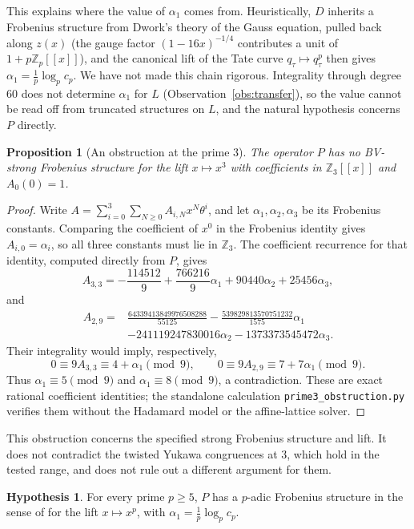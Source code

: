 \documentclass[11pt]{amsart}
\newtheorem{proposition}[theorem]{Proposition}
\theoremstyle{definition}
\newtheorem{hypothesis}[theorem]{Hypothesis}
\theoremstyle{remark}
\newcommand{\Z}{\mathbb{Z}}
\begin{document}
This explains where the value of $\alpha_1$ comes from. Heuristically, $D$ inherits a Frobenius
structure from Dwork's theory of the Gauss equation, pulled back along $z(x)$ (the gauge factor
$(1-16x)^{-1/4}$ contributes a unit of $1+p\Z_p[[x]]$), and the canonical lift of the Tate curve
$q_\tau\mapsto q_\tau^p$ then gives $\alpha_1=\frac1p\log_pc_p$. We have not made this chain
rigorous. Integrality through degree $60$ does not determine $\alpha_1$ for $L$
(Observation~\ref{obs:transfer}), so the value cannot be read off from truncated structures on $L$, and the natural hypothesis concerns $P$ directly.

\begin{proposition}[An obstruction at the prime $3$]\label{prop:prime3-obstruction}
The operator $P$ has no BV-strong Frobenius structure for the lift
$x\mapsto x^3$ with coefficients in $\Z_3[[x]]$ and $A_0(0)=1$.
\end{proposition}
\begin{proof}
Write $A=\sum_{i=0}^3\sum_{N\ge0} A_{i,N}x^N\theta^i$, and let
$\alpha_1,\alpha_2,\alpha_3$ be its Frobenius constants. Comparing the
coefficient of $x^0$ in the Frobenius identity gives
$A_{i,0}=\alpha_i$, so all three constants must lie in $\Z_3$.
The coefficient recurrence for that identity, computed directly from $P$,
gives
\[
A_{3,3}=-\frac{114512}{9}+\frac{766216}{9}\alpha_1
       +90440\alpha_2+25456\alpha_3,
\]
and
\begin{align*}
A_{2,9}={}&\frac{64339413849976508288}{55125}
 -\frac{539829813570751232}{1575}\alpha_1\\
 &-241119247830016\alpha_2-1373373545472\alpha_3.
\end{align*}
Their integrality would imply, respectively,
\[
0\equiv 9A_{3,3}\equiv4+\alpha_1\pmod9,
\qquad
0\equiv 9A_{2,9}\equiv7+7\alpha_1\pmod9.
\]
Thus $\alpha_1\equiv5\pmod9$ and $\alpha_1\equiv8\pmod9$, a contradiction.
These are exact rational coefficient identities; the standalone calculation
\texttt{prime3\_obstruction.py} verifies them without the Hadamard model or
the affine-lattice solver.
\end{proof}

This obstruction concerns the specified strong Frobenius structure and lift.
It does not contradict the twisted Yukawa congruences at $3$, which hold in
the tested range, and does not rule out a different argument for them.

\begin{hypothesis}\label{hyp:F}
For every prime $p\ge5$, $P$ has a $p$-adic Frobenius structure in the sense of \cite[Def.~1.1]{BV}
for the lift $x\mapsto x^p$, with $\alpha_1=\frac1p\log_pc_p$.
\end{hypothesis}
\end{document}
